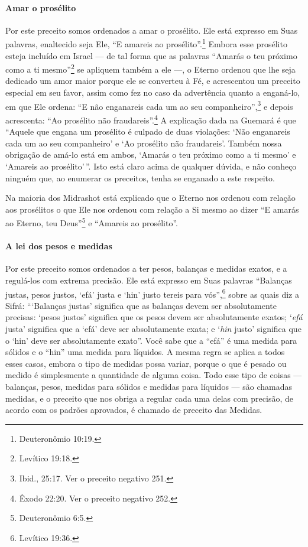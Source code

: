 \paragraph{Amar o prosélito}

Por este preceito somos ordenados a amar o prosélito. Ele está expresso
em Suas palavras, enaltecido seja Ele, ``E amareis ao prosélito''.\footnote{Deuteronômio 10:19.} Embora esse prosélito esteja incluído em Israel
--- de tal forma que as palavras ``Amarás o teu próximo como a ti mesmo''\footnote{Levítico 19:18.} se apliquem também a ele ---, o Eterno ordenou que lhe seja
dedicado um amor maior porque ele se converteu à Fé, e acrescentou um
preceito especial em seu favor, assim como fez no caso da advertência
quanto a enganá-lo, em que Ele ordena: ``E não enganareis cada um ao seu
companheiro'',\footnote{Ibid., 25:17. Ver o preceito negativo 251.} e depois acrescenta: ``Ao prosélito não fraudareis''.\footnote{Êxodo 22:20. Ver o preceito negativo 252.} A explicação
dada na Guemará é que ``Aquele que engana um prosélito é culpado de duas
violações: `Não enganareis cada um ao seu companheiro' e `Ao prosélito
não fraudareis'. Também nossa obrigação de amá-lo está em ambos, `Amarás
o teu próximo como a ti mesmo' e `Amareis ao prosélito'\,''. Isto está
claro acima de qualquer dúvida, e não conheço ninguém que, ao enumerar
os preceitos, tenha se enganado a este respeito.

Na maioria dos Midrashot está explicado que o Eterno nos ordenou com
relação aos prosélitos o que Ele nos ordenou com relação a Si mesmo ao
dizer ``E amarás ao Eterno, teu Deus''\footnote{Deuteronômio 6:5.} e ``Amareis ao
prosélito''.

\paragraph{A lei dos pesos e medidas}

Por este preceito somos ordenados a ter pesos, balanças e medidas
exatos, e a regulá-los com extrema precisão. Ele está expresso em Suas
palavras ``Balanças justas, pesos justos, `efá' justa e `hin' justo
tereis para vós'',\footnote{Levítico 19:36.} sobre as quais diz a Sifrá:
```Balanças justas' significa que as balanças devem ser absolutamente
precisas: `pesos justos' significa que os pesos devem ser absolutamente
exatos; `\emph{efá} justa' significa que a `efá' deve ser absolutamente
exata; e `\emph{hin} justo' significa que o `hin' deve ser absolutamente
exato''. Você sabe que a ``efá'' é uma medida para sólidos e o ``hin''
uma medida para líquidos. A mesma regra se aplica a todos esses casos,
embora o tipo de medidas possa variar, porque o que é pesado ou medido é
simplesmente a quantidade de alguma coisa. Todo esse tipo de coisas ---
balanças, pesos, medidas para sólidos e medidas para líquidos --- são
chamadas medidas, e o preceito que nos obriga a regular cada uma delas
com precisão, de acordo com os padrões aprovados, é chamado de preceito
das Medidas.


